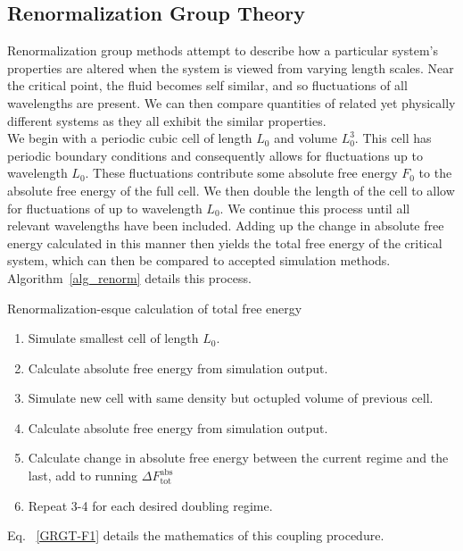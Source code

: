 \documentclass[12pt]{article}
\begin{document}
\subsection{Renormalization Group Theory}
Renormalization group methods attempt to describe how a particular system's properties are altered when the system is viewed from varying length scales. Near the critical point, the fluid becomes self similar, and so fluctuations of all wavelengths are present. We can then compare quantities of related yet physically different systems as they all exhibit the similar properties.\\
We begin with a periodic cubic cell of length $L_0$ and volume $L_0^3$. 
This cell has periodic boundary conditions and consequently allows for fluctuations up to wavelength $L_0$. These fluctuations contribute some absolute free energy $F_0$ to the absolute free energy of the full cell. We then double the length of the cell to allow for fluctuations of up to wavelength $L_0$. We continue this process until all relevant wavelengths have been included. Adding up the change in absolute free energy calculated in this manner then yields the total free energy of the critical system, which can then be compared to accepted simulation methods. Algorithm~\ref{alg_renorm} details this process. 

\begin{algorithm}[tb]
    \caption{Renormalization-esque calculation of total free energy}
    \label{alg_renorm}
    \hrulefill
    \begin{enumerate}
        \item Simulate smallest cell of length $L_0$.
        \item Calculate absolute free energy from simulation output.
        \item Simulate new cell with same density but octupled volume of previous cell.
        \item Calculate absolute free energy from simulation output.
        \item Calculate change in absolute free energy between the current regime and the last, add to running $\Delta F^{\text{abs}}_{\text{tot}}$
        \item Repeat 3-4 for each desired doubling regime.
    \end{enumerate}
    \hrulefill
\end{algorithm}

Eq. ~\ref{GRGT-F1} details the mathematics of this coupling procedure.
\end{document}
